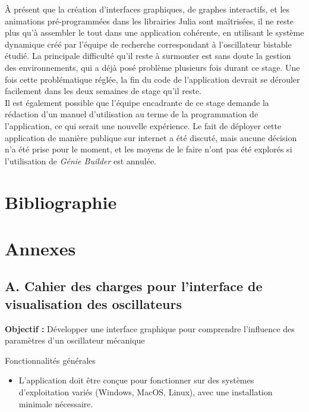 \documentclass[a4paper, french, 12pt, titlepage]{article}
\begin{document}
À présent que la création d'interfaces graphiques, de graphes interactifs, et les animations pré-programmées dans les librairies Julia sont maîtrisées, il ne reste plus qu'à assembler le tout dans une application cohérente, en utilisant le système dynamique créé par l'équipe de recherche correspondant à l'oscillateur bistable étudié.
La principale difficulté qu'il reste à surmonter est sans doute la gestion des environnements, qui a déjà posé problème plusieurs fois durant ce stage.
Une fois cette problématique réglée, la fin du code de l'application devrait se dérouler facilement dans les deux semaines de stage qu'il reste. \\

Il est également possible que l'équipe encadrante de ce stage demande la rédaction d'un manuel d'utilisation au terme de la programmation de l'application, ce qui serait une nouvelle expérience.
Le fait de déployer cette application de manière publique sur internet a été discuté, mais aucune décision n'a été prise pour le moment, et les moyens de le faire n'ont pas été explorés si l'utilisation de \emph{Génie Builder} est annulée.







\newpage

\section{Bibliographie}




\newpage

\listoffigures

\newpage

\section{Annexes}

\subsection*{A. Cahier des charges pour l'interface de visualisation des oscillateurs}


\textbf{Objectif :} Développer une interface graphique pour comprendre l'influence des paramètres d'un oscillateur mécanique

\large{Fonctionnalités générales}
\begin{itemize}
  \item L'application doit être conçue pour fonctionner sur des systèmes d'exploitation variés (Windows, MacOS, Linux), avec une installation minimale nécessaire.
\end{itemize}
\end{document}
